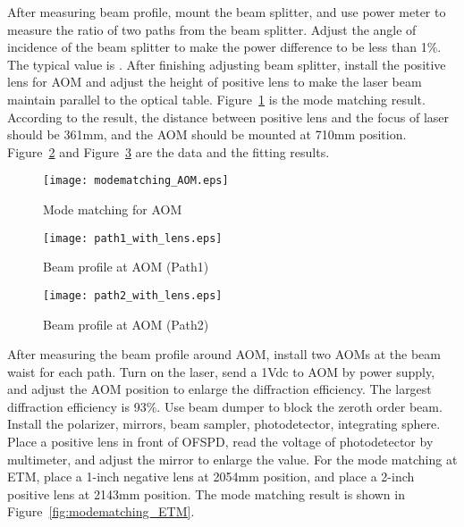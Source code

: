 After measuring beam profile, mount the beam splitter, and use power meter to measure the ratio of two paths from the beam splitter. Adjust the angle of incidence of the beam splitter to make the power difference to be less than 1$\%$. The typical value is \underline{\qquad\qquad}. After finishing adjusting beam splitter, install the positive lens for AOM and adjust the height of positive lens to make the laser beam maintain parallel to the optical table. Figure~\ref{fig:modematching_AOM} is the mode matching result. According to the result, the distance between positive lens and the focus of laser should be 361mm, and the AOM should be mounted at 710mm position. Figure~\ref{fig:beamprofile_AOM1} and Figure~\ref{fig:beamprofile_AOM2} are the data and the fitting results.

\begin{figure}
	\begin{center}
		\texttt{[image: modematching\_AOM.eps]}
		\caption{Mode matching for AOM} 
		\label{fig:modematching_AOM} 
	\end{center}
\end{figure}

\begin{figure}
	\begin{center}
		\texttt{[image: path1\_with\_lens.eps]}
		\caption{Beam profile at AOM (Path1)} 
		\label{fig:beamprofile_AOM1} 
	\end{center}
\end{figure}

\begin{figure}
	\begin{center}
		\texttt{[image: path2\_with\_lens.eps]}
		\caption{Beam profile at AOM (Path2)} 
		\label{fig:beamprofile_AOM2} 
	\end{center}
\end{figure}


After measuring the beam profile around AOM, install two AOMs at the beam waist for each path. Turn on the laser, send a 1Vdc to AOM by power supply, and adjust the AOM position to enlarge the diffraction efficiency. The largest diffraction efficiency is 93$\%$. Use beam dumper to block the zeroth order beam. Install the polarizer, mirrors, beam sampler, photodetector, integrating sphere. Place a positive lens in front of OFSPD, read the voltage of photodetector by multimeter, and adjust the mirror to enlarge the value. For the mode matching at ETM, place a 1-inch negative lens at 2054mm position, and place a 2-inch positive lens at 2143mm position. The mode matching result is shown in Figure~\ref{fig:modematching_ETM}.



